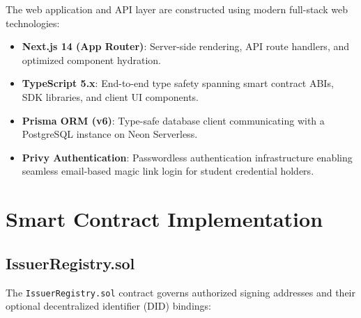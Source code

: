 The web application and API layer are constructed using modern full-stack web technologies:
\begin{itemize}
    \item \textbf{Next.js 14 (App Router)}: Server-side rendering, API route handlers, and optimized component hydration.
    \item \textbf{TypeScript 5.x}: End-to-end type safety spanning smart contract ABIs, SDK libraries, and client UI components.
    \item \textbf{Prisma ORM (v6)}: Type-safe database client communicating with a PostgreSQL instance on Neon Serverless.
    \item \textbf{Privy Authentication}: Passwordless authentication infrastructure enabling seamless email-based magic link login for student credential holders.
\end{itemize}

\section{Smart Contract Implementation}

\subsection{IssuerRegistry.sol}

The \texttt{IssuerRegistry.sol} contract governs authorized signing addresses and their optional decentralized identifier (DID) bindings:

